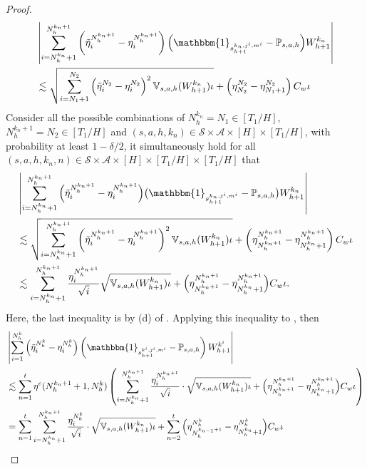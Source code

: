 \documentclass{article}
\newcommand{\sah}{\mathcal{S} \times \mathcal{A} \times [H]}
\begin{document}
\begin{proof}
    \begin{align*}
        &\left|\sum_{i=N_h^{k_n}+1}^{N_h^{k_n+1}}\left(\Tilde{\eta}_i^{N_h^{k_n+1}}-\eta_i^{N_h^{k_n+1}}\right)\Big(\mathbbm{1}_{s_{h+1}^{k_n,j^i,m^i}} - \mathbb{P}_{s,a,h}\Big)W_{h+1}^{k_n}\right|\\
        &\lesssim \sqrt{\sum_{i=N_1+1}^{N_2}\left(\Tilde{\eta}_i^{N_2}-\eta_i^{N_2}\right)^2\mathbb{V}_{s,a,h}(W_{h+1}^{k_n})\iota}+\left(\eta_{N_2}^{N_2}-\eta_{N_1+1}^{N_2}\right)C_w\iota
    \end{align*}
    Consider all the possible combinations of $N_h^{k_n} = N_1 \in [T_1/H]$, $N_h^{k_n+1} = N_2 \in [T_1/H]$ and $(s,a,h,k_n)\in \sah \times [T_1/H]$, with probability at least $1-\delta/2$, it simultaneously hold for all $(s,a,h,k_n,n)\in \sah \times [T_1/H] \times [T_1/H]$ that
    \begin{align*}
        &\left|\sum_{i=N_h^{k_n}+1}^{N_h^{k_n+1}}\Big(\Tilde{\eta}_i^{N_h^{k_n+1}}-\eta_i^{N_h^{k_n+1}}\Big)\big(\mathbbm{1}_{s_{h+1}^{k_n,j^i,m^i}} - \mathbb{P}_{s,a,h}\big)W_{h+1}^{k_n}\right| \\
        &\lesssim \sqrt{\sum_{i=N_h^{k_n}+1}^{N_h^{k_n+1}}\left(\Tilde{\eta}_i^{N_h^{k_n+1}}-\eta_i^{N_h^{k_n+1}}\right)^2\mathbb{V}_{s,a,h}(W_{h+1}^{k_n})\iota}+\left(\eta_{N_h^{k_n+1}}^{N_h^{k_n+1}}-\eta_{N_h^{k_n}+1}^{N_h^{k_n+1}}\right)C_w\iota\\
        &\lesssim \sum_{i=N_h^{k_n}+1}^{N_h^{k_n+1}}\frac{\eta_i^{N_h^{k_n+1}}}{\sqrt{i}} \sqrt{\mathbb{V}_{s,a,h}(W_{h+1}^{k_n})\iota}+ \Big(\eta_{N_h^{k_n+1}}^{N_h^{k_n+1}}-\eta_{N_h^{k_n}+1}^{N_h^{k_n+1}}\Big)C_w\iota.
    \end{align*}
    Here, the last inequality is by (d) of . Applying this inequality to , then
    \begin{align}
    \label{nondiff}
        &\left|\sum_{i=1} ^{N_h^k} \left(\Tilde{\eta}_i^{N_h^k}-\eta_i^{N_h^k}\right)\left(\mathbbm{1}_{s_{h+1}^{k^i,j^i,m^i}} - \mathbb{P}_{s,a,h}\right)W_{h+1}^{k^i}\right| \nonumber\\
        &\lesssim \sum_{n=1}^{t}\eta^c(N_h^{k_n+1}+1,N_h^k)\left(\sum_{i=N_h^{k_n}+1}^{N_h^{k_n+1}}\frac{\eta_i^{N_h^{k_n+1}}}{\sqrt{i}} \cdot \sqrt{\mathbb{V}_{s,a,h}(W_{h+1}^{k_n})\iota}+\Big(\eta_{N_h^{k_n+1}}^{N_h^{k_n+1}}-\eta_{N_h^{k_n}+1}^{N_h^{k_n+1}}\Big)C_w\iota\right) \nonumber\\
        & = \sum_{n=1}^{t}\sum_{i=N_h^{k_n}+1}^{N_h^{k_n+1}}\frac{\eta_i^{N_h^k}}{\sqrt{i}} \cdot \sqrt{\mathbb{V}_{s,a,h}(W_{h+1}^{k_n})\iota} + \sum_{n=2}^{t}\Big(\eta_{N_h^{k_{n-1}+1}}^{N_h^k}-\eta_{N_h^{k_n}+1}^{N_h^k}\Big)C_w\iota \nonumber\\

\end{align}
\end{proof}
\end{document}
